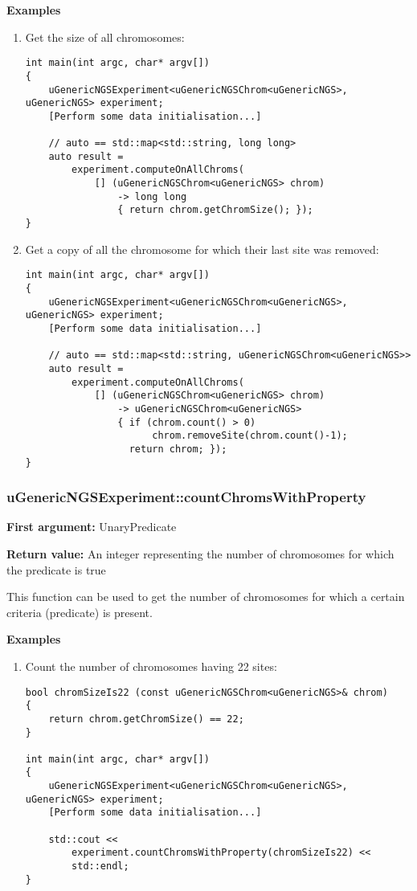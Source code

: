 \documentclass[letterpaper,10pt]{article}
\begin{document}
\bigskip
\noindent{}\textbf{Examples}
\begin{enumerate}
 \item Get the size of all chromosomes:
\begin{verbatim}
int main(int argc, char* argv[])
{
    uGenericNGSExperiment<uGenericNGSChrom<uGenericNGS>, uGenericNGS> experiment;
    [Perform some data initialisation...]

    // auto == std::map<std::string, long long>
    auto result = 
        experiment.computeOnAllChroms(
            [] (uGenericNGSChrom<uGenericNGS> chrom) 
                -> long long 
                { return chrom.getChromSize(); });
}
\end{verbatim}

 \item Get a copy of all the chromosome for which their last site was removed:
\begin{verbatim}
int main(int argc, char* argv[])
{
    uGenericNGSExperiment<uGenericNGSChrom<uGenericNGS>, uGenericNGS> experiment;
    [Perform some data initialisation...]

    // auto == std::map<std::string, uGenericNGSChrom<uGenericNGS>>
    auto result = 
        experiment.computeOnAllChroms(
            [] (uGenericNGSChrom<uGenericNGS> chrom) 
                -> uGenericNGSChrom<uGenericNGS>
                { if (chrom.count() > 0) 
                      chrom.removeSite(chrom.count()-1); 
                  return chrom; });
}
\end{verbatim}
\end{enumerate}

\subsubsection{uGenericNGSExperiment::countChromsWithProperty}
\textbf{First argument:} UnaryPredicate

\noindent{}\textbf{Return value:} An integer representing the number of chromosomes for which the predicate is true

\bigskip
\noindent{}This function can be used to get the number of chromosomes for which a certain criteria (predicate) is present.

\bigskip
\noindent{}\textbf{Examples}
\begin{enumerate}
 \item Count the number of chromosomes having 22 sites:
\begin{verbatim}
bool chromSizeIs22 (const uGenericNGSChrom<uGenericNGS>& chrom)
{
    return chrom.getChromSize() == 22;
}

int main(int argc, char* argv[])
{
    uGenericNGSExperiment<uGenericNGSChrom<uGenericNGS>, uGenericNGS> experiment;
    [Perform some data initialisation...]

    std::cout << 
        experiment.countChromsWithProperty(chromSizeIs22) << 
        std::endl;
}
\end{verbatim}
\end{enumerate}
\end{document}
